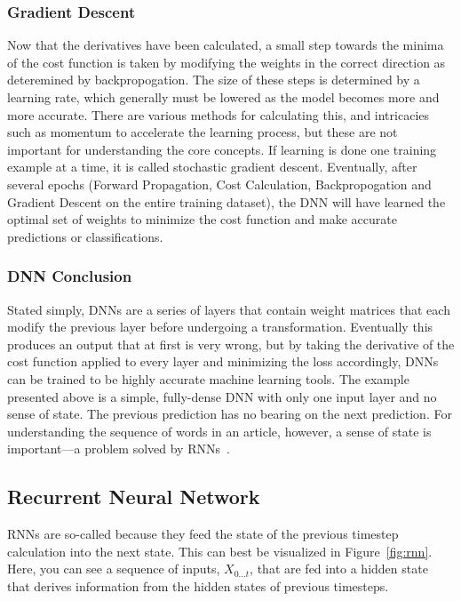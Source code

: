 \subsubsection{Gradient Descent}\label{grad}
Now that the derivatives have been calculated, a small step towards the minima of the cost function is taken by modifying the weights in the correct direction as deteremined by backpropogation. The size of these steps is determined by a learning rate, which generally must be lowered as the model becomes more and more accurate. There are various methods for calculating this, and intricacies such as momentum to accelerate the learning process, but these are not important for understanding the core concepts. If learning is done one training example at a time, it is called stochastic gradient descent. Eventually, after several epochs (Forward Propagation, Cost Calculation, Backpropogation and Gradient Descent on the entire training dataset), the DNN will have learned the optimal set of weights to minimize the cost function and make accurate predictions or classifications.

\subsubsection{DNN Conclusion}
Stated simply, DNNs are a series of layers that contain weight matrices that each modify the previous layer before undergoing a transformation. Eventually this produces an output that at first is very wrong, but by taking the derivative of the cost function applied to every layer and minimizing the loss accordingly, DNNs can be trained to be highly accurate machine learning tools. The example presented above is a simple, fully-dense DNN with only one input layer and no sense of state. The previous prediction has no bearing on the next prediction. For understanding the sequence of words in an article, however, a sense of state is important---a problem solved by RNNs~\cite{Elman1990}.

\subsection{Recurrent Neural Network}\label{rnn}
RNNs are so-called because they feed the state of the previous timestep calculation into the next state. This can best be visualized in Figure~\ref{fig:rnn}. Here, you can see a sequence of inputs, $X_{0...t}$, that are fed into a hidden state that derives information from the hidden states of previous timesteps.

